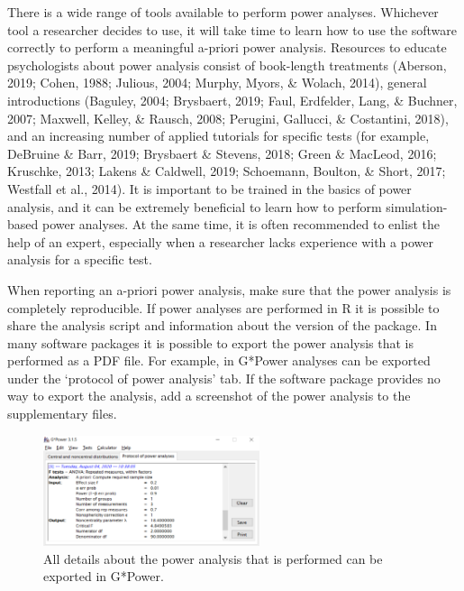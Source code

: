 \documentclass[
  english,
  ,jou, a4paper,floatsintext]{apa6}
\begin{document}
There is a wide range of tools available to perform power analyses. Whichever tool a researcher decides to use, it will take time to learn how to use the software correctly to perform a meaningful a-priori power analysis. Resources to educate psychologists about power analysis consist of book-length treatments (Aberson, 2019; Cohen, 1988; Julious, 2004; Murphy, Myors, \& Wolach, 2014), general introductions (Baguley, 2004; Brysbaert, 2019; Faul, Erdfelder, Lang, \& Buchner, 2007; Maxwell, Kelley, \& Rausch, 2008; Perugini, Gallucci, \& Costantini, 2018), and an increasing number of applied tutorials for specific tests (for example, DeBruine \& Barr, 2019; Brysbaert \& Stevens, 2018; Green \& MacLeod, 2016; Kruschke, 2013; Lakens \& Caldwell, 2019; Schoemann, Boulton, \& Short, 2017; Westfall et al., 2014). It is important to be trained in the basics of power analysis, and it can be extremely beneficial to learn how to perform simulation-based power analyses. At the same time, it is often recommended to enlist the help of an expert, especially when a researcher lacks experience with a power analysis for a specific test.

When reporting an a-priori power analysis, make sure that the power analysis is completely reproducible. If power analyses are performed in R it is possible to share the analysis script and information about the version of the package. In many software packages it is possible to export the power analysis that is performed as a PDF file. For example, in G*Power analyses can be exported under the `protocol of power analysis' tab. If the software package provides no way to export the analysis, add a screenshot of the power analysis to the supplementary files.

\begin{figure}
\includegraphics[width=240px]{images/gpowprotocol} \caption{All details about the power analysis that is performed can be exported in G*Power.}\label{fig:gpowprotocol}
\end{figure}
\end{document}
